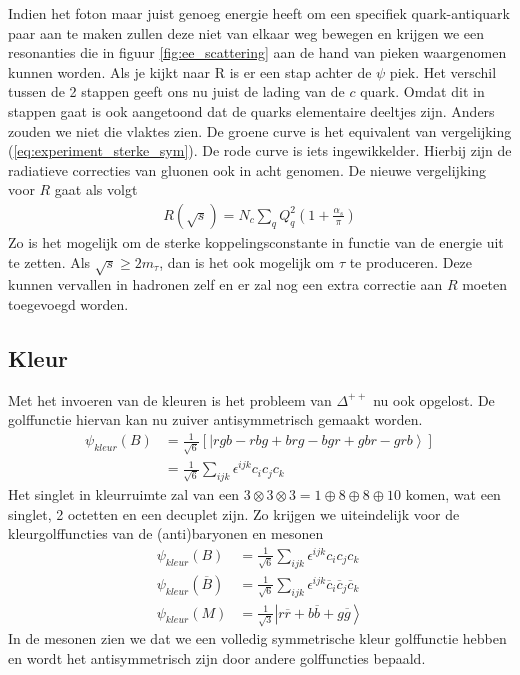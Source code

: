 \documentclass[../main.tex]{subfiles}
\begin{document}
Indien het foton maar juist genoeg energie heeft om een specifiek quark-antiquark paar aan te maken zullen deze niet van elkaar weg bewegen en krijgen we een resonanties die in figuur \ref{fig:ee_scattering} aan de hand van pieken waargenomen kunnen worden. Als je kijkt naar R is er een stap achter de $\psi$ piek. Het verschil tussen de 2 stappen geeft ons nu juist de lading van de $c$ quark. Omdat dit in stappen gaat is ook aangetoond dat de quarks elementaire deeltjes zijn. Anders zouden we niet die vlaktes zien. De groene curve is het equivalent van vergelijking (\ref{eq:experiment_sterke_sym}). De rode curve is iets ingewikkelder. Hierbij zijn de radiatieve correcties van gluonen ook in acht genomen. De nieuwe vergelijking voor $R$ gaat als volgt
\begin{equation}
    \begin{aligned}
        \label{eq:experiment_sterke_sym_extended}
        R(\sqrt{s}) = N_c\sum_q Q_q^2 (1+\frac{\alpha_s}{\pi})
    \end{aligned}
\end{equation}
Zo is het mogelijk om de sterke koppelingsconstante in functie van de energie uit te zetten. Als $\sqrt{s}\geq 2m_\tau$, dan is het ook mogelijk om $\tau$ te produceren. Deze kunnen vervallen in hadronen zelf en er zal nog een extra correctie aan $R$ moeten toegevoegd worden.

\subsection{Kleur}%
\label{sub:kleur}

Met het invoeren van de kleuren is het probleem van $\Delta^{++}$ nu ook opgelost. De golffunctie hiervan kan nu zuiver antisymmetrisch gemaakt worden.
\begin{equation}
    \begin{aligned}
        \label{eq:golffunctie_baryon}
        \psi_{kleur}(B) &= \frac{1}{\sqrt{6}} [\left|rgb-rbg+brg-bgr+gbr-grb\right>]\\
                        &= \frac{1}{\sqrt{6}} \sum_{ijk} \epsilon^{ijk}c_ic_jc_k
    \end{aligned}
\end{equation}
Het singlet in kleurruimte zal van een $3\otimes 3\otimes 3 = 1\oplus 8\oplus 8\oplus 10$ komen, wat een singlet, 2 octetten en een decuplet zijn. Zo krijgen we uiteindelijk voor de kleurgolffuncties van de (anti)baryonen en mesonen
\begin{equation}
    \begin{aligned}
        \label{eq:kleur_golffunctie}
        \psi_{kleur}(B) &= \frac{1}{\sqrt{6}} \sum_{ijk} \epsilon^{ijk}c_ic_jc_k\\
        \psi_{kleur}(\overline B) &= \frac{1}{\sqrt{6}} \sum_{ijk} \epsilon^{ijk}\overline c_i \overline c_j\overline c_k\\
        \psi_{kleur}(M) &= \frac{1}{\sqrt{3}} \left|r\overline r + b\overline b + g\overline g \right>
    \end{aligned}
\end{equation}
In de mesonen zien we dat we een volledig symmetrische kleur golffunctie hebben en wordt het antisymmetrisch zijn door andere golffuncties bepaald.
\end{document}
